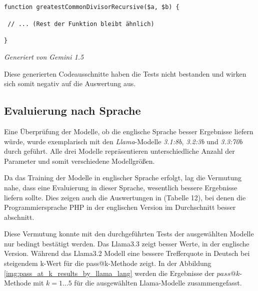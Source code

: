 \hrulefill

\texttt{function greatestCommonDivisorRecursive(\$a, \$b) \{}

\texttt{\hspace{0.6cm} // ... (Rest der Funktion bleibt ähnlich)}

\texttt{\}}

\begin{flushright}
	\textit{Generiert von Gemini 1.5}
\end{flushright}

\hrulefill

Diese generierten Codeausschnitte haben die Tests nicht bestanden und wirken sich somit negativ auf die Auswertung aus.\vspace{0.2cm}


\subsection{Evaluierung nach Sprache}
Eine Überprüfung der Modelle, ob die englische Sprache besser Ergebnisse liefern würde, wurde exemplarisch mit den \textit{Llama}-Modelle \textit{3.1:8b}, \textit{3.2:3b} und \textit{3.3:70b} durch geführt. Alle drei Modelle repräsentieren unterschiedliche Anzahl der Parameter und somit verschiedene Modellgrößen.\vspace{0.2cm}

Da das Training der Modelle in englischer Sprache erfolgt, lag die Vermutung nahe, dass eine Evaluierung in dieser Sprache, wesentlich bessere Ergebnisse liefern sollte. Dies zeigen auch die Auswertungen in \cite[][11]{peng-2024} (Tabelle 12), bei denen die Programmiersprache PHP in der englischen Version im Durchschnitt besser abschnitt.\vspace{0.2cm}

Diese Vermutung konnte mit den durchgeführten Tests der ausgewählten Modelle nur bedingt bestätigt werden. Das Llama3.3 zeigt besser Werte, in der englische Version. Während das Llama3.2 Modell eine bessere Trefferquote in Deutsch bei steigendem k-Wert für die pass@k-Methode zeigt. In der Abbildung \ref{img:pass_at_k_results_by_llama_lang} werden die Ergebnisse der $pass@k$-Methode mit $k=1 … 5$ für die ausgewählten Llama-Modelle zusammengefasst.\vspace{0.2cm}

